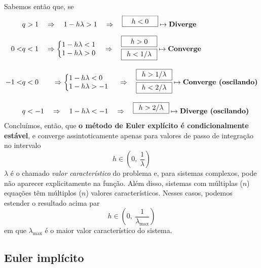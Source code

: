 \documentclass[12pt]{peqdoc}
\begin{document}
	Sabemos então que, se
	\begin{align*}
	&q>1 \quad\Rightarrow\quad 1-h\lambda>1 \quad\Rightarrow\quad \framebox(50,15){$h<0$}\mapsto\text{\textbf{Diverge}}\\[6pt]
	0<&q<1\quad\Rightarrow\left\{\begin{matrix}
	1-h\lambda < 1\\1-h\lambda>0
	\end{matrix}\right.\quad\Rightarrow\quad\begin{matrix}
	\framebox(50,15){$h >0$}\\\framebox(50,15){$h<1/\lambda$}
	\end{matrix}\mapsto\text{\textbf{Converge}}\\[6pt]
	-1<&q<0\qquad\Rightarrow\left\{\begin{matrix}
	1-h\lambda < 0\phantom{-}\\1-h\lambda>-1
	\end{matrix}\right.\ \ \ \ \Rightarrow\quad\begin{matrix}
	\framebox(50,15){$h >1/\lambda$}\\\framebox(50,15){$h<2/\lambda$}
	\end{matrix}\mapsto\text{\textbf{Converge (oscilando)}}\\[6pt]
	&q<-1\quad\Rightarrow\quad 1-h\lambda<-1\quad\Rightarrow\quad \framebox(50,15)[c]{$h>2/\lambda$}\mapsto\text{\textbf{Diverge (oscilando)}}
	\end{align*}
	\noindent Concluímos, então, que \textbf{o método de Euler explícito é condicionalmente estável}, e converge assintoticamente apenas para valores de passo de integração no intervalo
	\begin{equation}
	h\in\left(0,\ \frac{1}{\lambda}\right)\nonumber
	\end{equation} 
	\noindent $ \lambda $ é o chamado \textit{valor característico} do problema e, para sistemas complexos, pode não aparecer explicitamente na função. Além disso, sistemas com múltiplas ($ n $) equações têm múltiplos ($ n $) valores característicos. Nesses casos, podemos estender o resultado acima par
	\begin{equation}
	h\in\left(0,\ \frac{1}{\lambda_\text{max}}\right)\nonumber
	\end{equation}
	\noindent em que $ \lambda_\text{max} $ é o maior valor característico do sistema.
	
	\subsection{Euler implícito}
	
\end{document}
